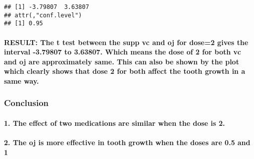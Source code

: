\documentclass[]{article}
\newenvironment{Shaded}{\begin{snugshade}}{\end{snugshade}}
\newcommand{\KeywordTok}[1]{\textcolor[rgb]{0.13,0.29,0.53}{\textbf{#1}}}
\newcommand{\DataTypeTok}[1]{\textcolor[rgb]{0.13,0.29,0.53}{#1}}
\newcommand{\DecValTok}[1]{\textcolor[rgb]{0.00,0.00,0.81}{#1}}
\newcommand{\OperatorTok}[1]{\textcolor[rgb]{0.81,0.36,0.00}{\textbf{#1}}}
\newcommand{\NormalTok}[1]{#1}
\let\oldparagraph\paragraph
\renewcommand{\paragraph}[1]{\oldparagraph{#1}\mbox{}}
\begin{document}
\begin{Shaded}
\end{Shaded}

\begin{verbatim}
## [1] -3.79807  3.63807
## attr(,"conf.level")
## [1] 0.95
\end{verbatim}

\paragraph{RESULT: The t test between the supp vc and oj for dose=2
gives the interval -3.79807 to 3.63807. Which means the dose of 2 for
both vc and oj are approximately same. This can also be shown by the
plot which clearly shows that dose 2 for both affect the tooth growth in
a same
way.}\label{result-the-t-test-between-the-supp-vc-and-oj-for-dose2-gives-the-interval--3.79807-to-3.63807.-which-means-the-dose-of-2-for-both-vc-and-oj-are-approximately-same.-this-can-also-be-shown-by-the-plot-which-clearly-shows-that-dose-2-for-both-affect-the-tooth-growth-in-a-same-way.}

\subsubsection{Conclusion}\label{conclusion}

\paragraph{1. The effect of two medications are similar when the dose is
2.}\label{the-effect-of-two-medications-are-similar-when-the-dose-is-2.}

\paragraph{2. The oj is more effective in tooth growth when the doses
are 0.5 and
1}\label{the-oj-is-more-effective-in-tooth-growth-when-the-doses-are-0.5-and-1}
\end{document}

